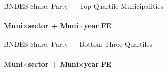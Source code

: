 \documentclass[aspectratio=169,10pt]{beamer}
\newcommand{\tbndes}{../tables/agg_firm_bndes_sector}
\begin{document}
\begin{frame}[t,shrink=5]{BNDES Share, Party --- Top-Quartile Municipalities}
\framesubtitle{Muni$\times$sector + Muni$\times$year FE}
\begin{center}\footnotesize

\end{center}
\end{frame}

\begin{frame}[t,shrink=5]{BNDES Share, Party --- Bottom Three Quartiles}
\framesubtitle{Muni$\times$sector + Muni$\times$year FE}
\begin{center}\footnotesize

\end{center}
\end{frame}
\end{document}
